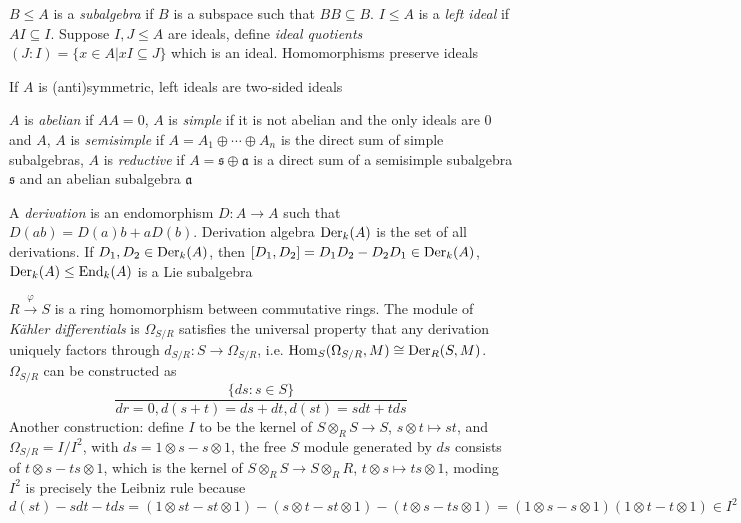 \documentclass[main]{subfiles}
\begin{document}
\begin{definition}
$B\leq A$ is a \textit{subalgebra} if $B$ is a subspace such that $BB\subseteq B$. $I\leq A$ is a \textit{left ideal} if $AI\subseteq I$. Suppose $I,J\leq A$ are ideals, define \textit{ideal quotients} $(J:I)=\{x\in A|xI\subseteq J\}$ which is an ideal. Homomorphisms preserve ideals
\end{definition}

\begin{remark}
If $A$ is (anti)symmetric, left ideals are two-sided ideals
\end{remark}

\begin{definition}
$A$ is \textit{abelian} if $AA=0$, $A$ is \textit{simple} if it is not abelian and the only ideals are $0$ and $A$, $A$ is \textit{semisimple} if $A=A_1\oplus\cdots\oplus A_n$ is the direct sum of simple subalgebras, $A$ is \textit{reductive} if $A=\mathfrak{s}\oplus\mathfrak{a}$ is a direct sum of a semisimple subalgebra $\mathfrak{s}$ and an abelian subalgebra $\mathfrak{a}$
\end{definition}

\begin{definition}
A \textit{derivation} is an endomorphism $D:A\to A$ such that $D(ab)=D(a)b+aD(b)$. Derivation algebra $\operatorname{Der}_{k}(A)$ is the set of all derivations. If $D_1,D_2\in \operatorname{Der}_{k}(A)$, then $[D_1,D_2]=D_1D_2-D_2D_1\in \operatorname{Der}_{k}(A)$, $\operatorname{Der}_{k}(A)\leq \operatorname{End}_{k}(A)$ is a Lie subalgebra
\end{definition}

\begin{definition}
$R\xrightarrow\varphi S$ is a ring homomorphism between commutative rings. The module of \textit{K\"ahler differentials} is $\Omega_{S/R}$ satisfies the universal property that any derivation uniquely factors through $d_{S/R}:S\to\Omega_{S/R}$, i.e. $\operatorname{Hom}_S(\Omega_{S/R},M)\cong\operatorname{Der}_R(S,M)$. $\Omega_{S/R}$ can be constructed as
\[\frac{\{ds:s\in S\}}{dr=0,d(s+t)=ds+dt,d(st)=sdt+tds}\]
Another construction: define $I$ to be the kernel of $S\otimes_RS\to S$, $s\otimes t\mapsto st$, and $\Omega_{S/R}=I/I^2$, with $ds=1\otimes s-s\otimes 1$, the free $S$ module generated by $ds$ consists of $t\otimes s-ts\otimes1$, which is the kernel of $S\otimes_RS\to S\otimes_RR$, $t\otimes s\mapsto ts\otimes 1$, moding $I^2$ is precisely the Leibniz rule because $d(st)-sdt-tds=(1\otimes st-st\otimes 1)-(s\otimes t-st\otimes1)-(t\otimes s-ts\otimes1)=(1\otimes s-s\otimes1)(1\otimes t-t\otimes1)\in I^2$
\end{definition}
\end{document}

